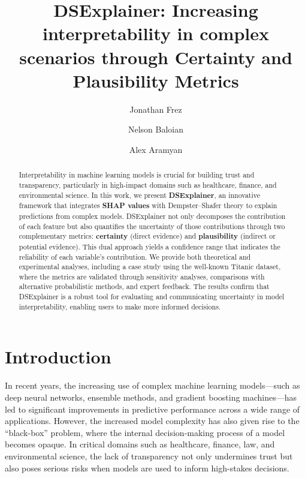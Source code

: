 \documentclass[acmlarge]{acmart}
\title{DSExplainer: Increasing interpretability in complex scenarios through Certainty and Plausibility Metrics}
\author{Jonathan Frez}
\affiliation{%
  \institution{Universidad Diego Portales}
  \city{Santiago}
  \country{Chile}
}
\author{Nelson Baloian}
\affiliation{%
  \institution{Universidad de Chile}
  \city{Santiago}
  \country{Chile}
}
\author{Alex Aramyan}
\affiliation{%
  \institution{?}
  \city{?}
  \country{Armenia}
}
\begin{document}
\begin{abstract}
Interpretability in machine learning models is crucial for building trust and transparency, particularly in high-impact domains such as healthcare, finance, and environmental science. In this work, we present \textbf{DSExplainer}, an innovative framework that integrates \textbf{SHAP values} with Dempster--Shafer theory to explain predictions from complex models. DSExplainer not only decomposes the contribution of each feature but also quantifies the uncertainty of those contributions through two complementary metrics: \textbf{certainty} (direct evidence) and \textbf{plausibility} (indirect or potential evidence). This dual approach yields a confidence range that indicates the reliability of each variable's contribution. We provide both theoretical and experimental analyses, including a case study using the well-known Titanic dataset, where the metrics are validated through sensitivity analyses, comparisons with alternative probabilistic methods, and expert feedback. The results confirm that DSExplainer is a robust tool for evaluating and communicating uncertainty in model interpretability, enabling users to make more informed decisions.
\end{abstract}





\maketitle

\section{Introduction}

In recent years, the increasing use of complex machine learning models—such as deep neural networks, ensemble methods, and gradient boosting machines—has led to significant improvements in predictive performance across a wide range of applications. However, the increased model complexity has also given rise to the “black-box” problem, where the internal decision-making process of a model becomes opaque. In critical domains such as healthcare, finance, law, and environmental science, the lack of transparency not only undermines trust but also poses serious risks when models are used to inform high-stakes decisions.
\end{document}

